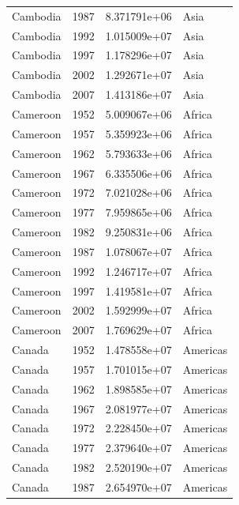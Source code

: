 \documentclass[
  letterpaper,
  DIV=11,
  numbers=noendperiod]{scrreprt}
\begin{document}
\begin{tcolorbox}
\begin{tabular}{lrrl}
Cambodia                 &  1987 &  8.371791e+06 &      Asia \\
Cambodia                 &  1992 &  1.015009e+07 &      Asia \\
Cambodia                 &  1997 &  1.178296e+07 &      Asia \\
Cambodia                 &  2002 &  1.292671e+07 &      Asia \\
Cambodia                 &  2007 &  1.413186e+07 &      Asia \\
Cameroon                 &  1952 &  5.009067e+06 &    Africa \\
Cameroon                 &  1957 &  5.359923e+06 &    Africa \\
Cameroon                 &  1962 &  5.793633e+06 &    Africa \\
Cameroon                 &  1967 &  6.335506e+06 &    Africa \\
Cameroon                 &  1972 &  7.021028e+06 &    Africa \\
Cameroon                 &  1977 &  7.959865e+06 &    Africa \\
Cameroon                 &  1982 &  9.250831e+06 &    Africa \\
Cameroon                 &  1987 &  1.078067e+07 &    Africa \\
Cameroon                 &  1992 &  1.246717e+07 &    Africa \\
Cameroon                 &  1997 &  1.419581e+07 &    Africa \\
Cameroon                 &  2002 &  1.592999e+07 &    Africa \\
Cameroon                 &  2007 &  1.769629e+07 &    Africa \\
Canada                   &  1952 &  1.478558e+07 &  Americas \\
Canada                   &  1957 &  1.701015e+07 &  Americas \\
Canada                   &  1962 &  1.898585e+07 &  Americas \\
Canada                   &  1967 &  2.081977e+07 &  Americas \\
Canada                   &  1972 &  2.228450e+07 &  Americas \\
Canada                   &  1977 &  2.379640e+07 &  Americas \\
Canada                   &  1982 &  2.520190e+07 &  Americas \\
Canada                   &  1987 &  2.654970e+07 &  Americas \\

\end{tabular}
\end{tcolorbox}
\end{document}
